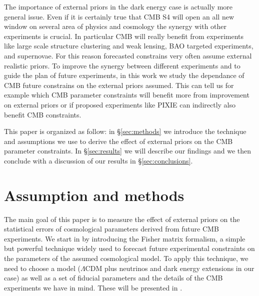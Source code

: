 \documentclass[aps,prd,preprint,groupedaddress]{revtex4-1}
\newcommand\refsec[1]{\S\ref{sec:#1}}
\begin{document}
The importance of external priors in the dark energy case is actually more general issue. Even if it is certainly true that CMB S4 will open an all new window on several area of physics and cosmology the synergy with other experiments is crucial. In particular CMB will really benefit from experiments like large scale structure clustering and weak lensing, BAO targeted experiments, and supernovae. 
For this reason forecasted constrains very often assume external realistic priors. To improve the synergy between different experiments and to guide the plan of future experiments, in this work we study the dependance of CMB future constrains on the external priors assumed.
This can tell us for example which CMB parameter constraints will benefit more from improvement on external priors or if proposed experiments like PIXIE \cite{2011JCAP...07..025K} can indirectly also benefit CMB constraints. 

This paper is organized as follow: in \refsec{methods} we introduce the technique and assumptions we use to derive the effect of external priors on the CMB parameter constraints. In \refsec{results} we will describe our findings and we then conclude with a discussion of our results in \refsec{conclusions}.



\section{Assumption and methods \label{sec:methods}}
The main goal of this paper is to measure the effect of external priors on the statistical errors of cosmological parameters derived from future CMB experiments.
We start in  by introducing the Fisher matrix formalism, a simple but powerful technique widely used to forecast future experimental constraints on the parameters of the assumed cosmological model. To apply this technique, we need to choose a model ($\Lambda$CDM plus neutrinos and dark energy extensions in our case) as well as a set of fiducial parameters and the details of the CMB experiments we have in mind. These will be presented in .
\end{document}
